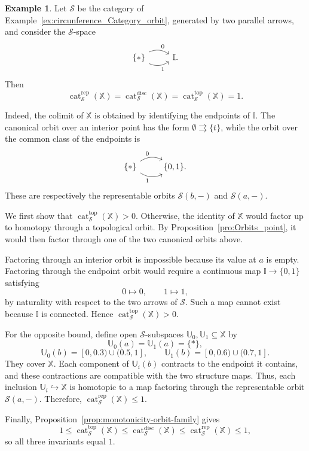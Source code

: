 \documentclass[12pt]{amsart}
\theoremstyle{definition}
\newtheorem{ex}[teo]{Example}
\theoremstyle{remark}
\numberwithin{figure}{section}%
\newcommand{\cat}{\mathop{\mathrm{cat}}}
\newcommand{\X}{\mathbb{X}}
\newcommand{\Uu}{\mathbb{U}}
\begin{document}
\begin{ex}\label{ex:category-two-parallel-arrows}
Let $\mathcal S$ be the category of
Example~\ref{ex:circunference_Category_orbit}, generated by two parallel
arrows, and consider the $\mathcal S$-space
\[
\begin{tikzcd}
\{*\}
  \arrow[r,"0",bend left]
  \arrow[r,"1"',bend right]
&
\mathbb I.
\end{tikzcd}
\]
Then
\[
\cat_{\mathcal S}^{\mathrm{rep}}(\X)
=
\cat_{\mathcal S}^{\mathrm{disc}}(\X)
=
\cat_{\mathcal S}^{\mathrm{top}}(\X)
=
1.
\]

Indeed, the colimit of $\X$ is obtained by identifying the endpoints of
$\mathbb I$. The canonical orbit over an interior point has the form
$\emptyset\rightrightarrows\{t\}$, while the orbit over the common class
of the endpoints is
\[
\begin{tikzcd}
\{*\}
  \arrow[r,"0",bend left]
  \arrow[r,"1"',bend right]
&
\{0,1\}.
\end{tikzcd}
\]
These are respectively the representable orbits
$\mathcal S(b,-)$ and $\mathcal S(a,-)$.

We first show that
$\cat_{\mathcal S}^{\mathrm{top}}(\X)>0$. Otherwise, the identity of
$\X$ would factor up to homotopy through a topological orbit. By
Proposition~\ref{pro:Orbits_point}, it would then factor through one of
the two canonical orbits above.

Factoring through an interior orbit is impossible because its value at
$a$ is empty. Factoring through the endpoint orbit would require a
continuous map $\mathbb I\to\{0,1\}$ satisfying
\[
0\longmapsto0,
\qquad
1\longmapsto1,
\]
by naturality with respect to the two arrows of $\mathcal S$. Such a map
cannot exist because $\mathbb I$ is connected. Hence
$\cat_{\mathcal S}^{\mathrm{top}}(\X)>0$.

For the opposite bound, define open $\mathcal S$-subspaces
$\Uu_0,\Uu_1\subseteq\X$ by
\[
\Uu_0(a)=\Uu_1(a)=\{*\},
\]
\[
\Uu_0(b)=[0,0.3)\cup(0.5,1],
\qquad
\Uu_1(b)=[0,0.6)\cup(0.7,1].
\]
They cover $\X$. Each component of $\Uu_i(b)$ contracts to the endpoint
it contains, and these contractions are compatible with the two
structure maps. Thus, each inclusion $\Uu_i\hookrightarrow\X$ is
homotopic to a map factoring through the representable orbit
$\mathcal S(a,-)$. Therefore,
$\cat_{\mathcal S}^{\mathrm{rep}}(\X)\leq1$.

Finally, Proposition~\ref{prop:monotonicity-orbit-family} gives
\[
1
\leq
\cat_{\mathcal S}^{\mathrm{top}}(\X)
\leq
\cat_{\mathcal S}^{\mathrm{disc}}(\X)
\leq
\cat_{\mathcal S}^{\mathrm{rep}}(\X)
\leq1,
\]
so all three invariants equal $1$.
\end{ex}
\end{document}
